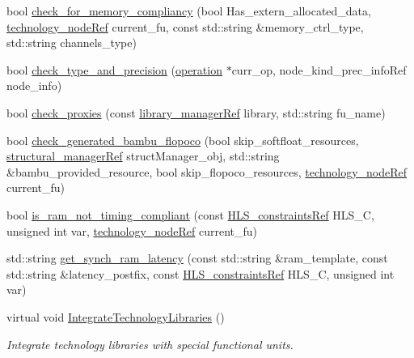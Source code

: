 \begin{DoxyCompactItemize}
\item 
bool \hyperlink{classallocation_abcfa5870832b4b9d8d194054d7b2f86b}{check\+\_\+for\+\_\+memory\+\_\+compliancy} (bool Has\+\_\+extern\+\_\+allocated\+\_\+data, \hyperlink{technology__node_8hpp_a33dd193b7bd6b987bf0d8a770a819fa7}{technology\+\_\+node\+Ref} current\+\_\+fu, const std\+::string \&memory\+\_\+ctrl\+\_\+type, std\+::string channels\+\_\+type)
\item 
bool \hyperlink{classallocation_a92dce6f1c4e5c6c794ef18ed545fc21d}{check\+\_\+type\+\_\+and\+\_\+precision} (\hyperlink{structoperation}{operation} $\ast$curr\+\_\+op, node\+\_\+kind\+\_\+prec\+\_\+info\+Ref node\+\_\+info)
\item 
bool \hyperlink{classallocation_a11a59e23f159e981fdb7d62446153267}{check\+\_\+proxies} (const \hyperlink{library__manager_8hpp_aacc6d633b0aa80ecfeb1180fd480ae68}{library\+\_\+manager\+Ref} library, std\+::string fu\+\_\+name)
\item 
bool \hyperlink{classallocation_ad0e5db03715e2282b6d3d78507bcf6fb}{check\+\_\+generated\+\_\+bambu\+\_\+flopoco} (bool skip\+\_\+softfloat\+\_\+resources, \hyperlink{structural__manager_8hpp_ab3136f0e785d8535f8d252a7b53db5b5}{structural\+\_\+manager\+Ref} struct\+Manager\+\_\+obj, std\+::string \&bambu\+\_\+provided\+\_\+resource, bool skip\+\_\+flopoco\+\_\+resources, \hyperlink{technology__node_8hpp_a33dd193b7bd6b987bf0d8a770a819fa7}{technology\+\_\+node\+Ref} current\+\_\+fu)
\item 
bool \hyperlink{classallocation_a0ade22133e76bb62a10d4dc280842f01}{is\+\_\+ram\+\_\+not\+\_\+timing\+\_\+compliant} (const \hyperlink{hls__constraints_8hpp_ac394d1c5cd991614133724294a79182b}{H\+L\+S\+\_\+constraints\+Ref} H\+L\+S\+\_\+C, unsigned int var, \hyperlink{technology__node_8hpp_a33dd193b7bd6b987bf0d8a770a819fa7}{technology\+\_\+node\+Ref} current\+\_\+fu)
\item 
std\+::string \hyperlink{classallocation_acef7ab9b504f496fa9367192c5edca22}{get\+\_\+synch\+\_\+ram\+\_\+latency} (const std\+::string \&ram\+\_\+template, const std\+::string \&latency\+\_\+postfix, const \hyperlink{hls__constraints_8hpp_ac394d1c5cd991614133724294a79182b}{H\+L\+S\+\_\+constraints\+Ref} H\+L\+S\+\_\+C, unsigned int var)
\item 
virtual void \hyperlink{classallocation_a2a1bfe82ec889179c591b1ebee43464b}{Integrate\+Technology\+Libraries} ()
\begin{DoxyCompactList}\small\item\em Integrate technology libraries with special functional units. \end{DoxyCompactList}\item 

\end{DoxyCompactItemize}
